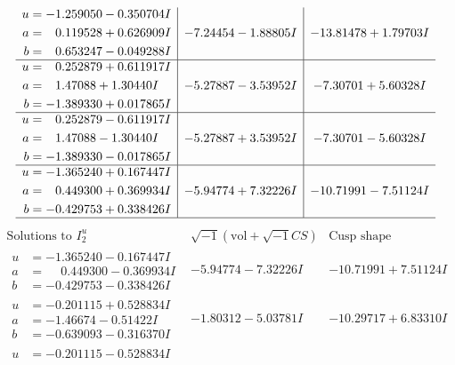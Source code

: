 \documentclass[1p]{elsarticle_modified}
\theoremstyle{definition}
\newcommand{\I}{\sqrt{-1}}
\begin{document}
$$\begin{array}{c|c|c}
\begin{aligned}
u &= -1.259050 - 0.350704 I \\
a &= \phantom{-}0.119528 + 0.626909 I \\
b &= \phantom{-}0.653247 - 0.049288 I\end{aligned}
 & -7.24454 - 1.88805 I & -13.81478 + 1.79703 I \\ \hline\begin{aligned}
u &= \phantom{-}0.252879 + 0.611917 I \\
a &= \phantom{-}1.47088 + 1.30440 I \\
b &= -1.389330 + 0.017865 I\end{aligned}
 & -5.27887 - 3.53952 I & -7.30701 + 5.60328 I \\ \hline\begin{aligned}
u &= \phantom{-}0.252879 - 0.611917 I \\
a &= \phantom{-}1.47088 - 1.30440 I \\
b &= -1.389330 - 0.017865 I\end{aligned}
 & -5.27887 + 3.53952 I & -7.30701 - 5.60328 I \\ \hline\begin{aligned}
u &= -1.365240 + 0.167447 I \\
a &= \phantom{-}0.449300 + 0.369934 I \\
b &= -0.429753 + 0.338426 I\end{aligned}
 & -5.94774 + 7.32226 I & -10.71991 - 7.51124 I\\
 \hline 
 \end{array}$$\newpage$$\begin{array}{c|c|c}  
\text{Solutions to }I^u_{2}& \I (\text{vol} + \sqrt{-1}CS) & \text{Cusp shape}\\
 \hline 
\begin{aligned}
u &= -1.365240 - 0.167447 I \\
a &= \phantom{-}0.449300 - 0.369934 I \\
b &= -0.429753 - 0.338426 I\end{aligned}
 & -5.94774 - 7.32226 I & -10.71991 + 7.51124 I \\ \hline\begin{aligned}
u &= -0.201115 + 0.528834 I \\
a &= -1.46674 - 0.51422 I \\
b &= -0.639093 - 0.316370 I\end{aligned}
 & -1.80312 - 5.03781 I & -10.29717 + 6.83310 I \\ \hline\begin{aligned}
u &= -0.201115 - 0.528834 I \\

\end{aligned}
\end{array}$$
\end{document}
